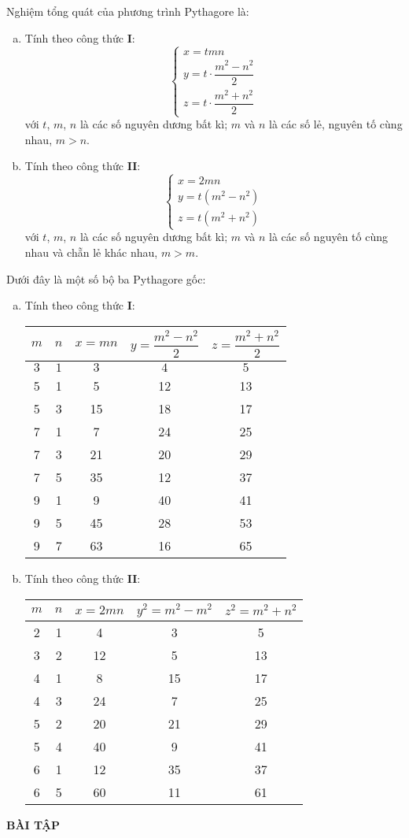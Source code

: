 Nghiệm tổng quát của phương trình Pythagore là:
\begin{enumerate}[a)]
	\item Tính theo công thức \textbf{I}:
	$$\begin{cases}
		x=tmn\\
		y=t\cdot\dfrac{m^2-n^2}{2}\\
		z=t\cdot\dfrac{m^2+n^2}{2}
	\end{cases}$$
	với $t$, $m$, $n$ là các số nguyên dương bất kì; $m$ và $n$ là các số lẻ, nguyên tố cùng nhau, $m>n$.
	\item Tính theo công thức \textbf{II}:\\
	$$\begin{cases}
	x=2mn\\
	y=t(m^2-n^2)\\
	z=t(m^2+n^2)
	\end{cases}$$
	với $t$, $m$, $n$ là các số nguyên dương bất kì; $m$ và $n$ là các số nguyên tố cùng nhau và chẵn lẻ khác nhau, $m>m$.
\end{enumerate}
Dưới đây là một số bộ ba Pythagore gốc:
\begin{enumerate}[a)]
	\item Tính theo công thức \textbf{I}:
	\begin{center}
		\begin{tabular}{|c|c|c|c|c|}\hline
			$m$&$n$&$x=mn$&$y=\dfrac{m^2-n^2}{2}$&$z=\dfrac{m^2+n^2}{2}$\\ \hline
			$3$&$1$&$3$&$4$&$5$\\ \hline
			5&1&5&12&13\\
			5&3&15&18&17\\ \hline
			7&1&7&24&25\\
			7&3&21&20&29\\
			7&5&35&12&37\\ \hline
			9&1&9&40&41\\
			9&5&45&28&53\\
			9&7&63&16&65\\ \hline
		\end{tabular}
	\end{center}
\item Tính theo công thức \textbf{II}:
\begin{center}
	\begin{tabular}{|c|c|c|c|c|}\hline
		$m$&$n$&$x=2mn$&$y^2=m^2-m^2$&$z^2=m^2+n^2$\\ \hline
		2&1&4&3&5\\ \hline
		3&2&12&5&13\\ \hline
		4&1&8&15&17\\
		4&3&24&7&25\\ \hline
		5&2&20&21&29\\
		5&4&40&9&41\\ \hline
		6&1&12&35&37\\
		6&5&60&11&61\\ \hline
	\end{tabular}
\end{center}
\end{enumerate}
\begin{center}
    \textbf{BÀI TẬP}
\end{center}

